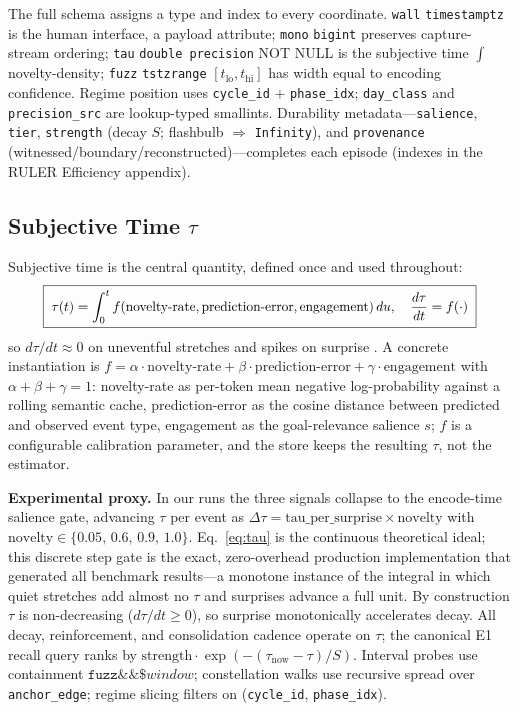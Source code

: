 \documentclass[letterpaper]{article}
\begin{document}
The full schema assigns a type and index to every coordinate. \texttt{wall} \texttt{timestamptz} is the human interface, a payload attribute; \texttt{mono} \texttt{bigint} preserves capture-stream ordering; \texttt{tau} \texttt{double precision} NOT NULL is the subjective time $\int$ novelty-density; \texttt{fuzz} \texttt{tstzrange} $[t_{\text{lo}},t_{\text{hi}}]$ has width equal to encoding confidence. Regime position uses \texttt{cycle\_id} + \texttt{phase\_idx}; \texttt{day\_class} and \texttt{precision\_src} are lookup-typed smallints. Durability metadata---\texttt{salience}, \texttt{tier}, \texttt{strength} (decay $S$; flashbulb $\Rightarrow$ \texttt{Infinity}), and \texttt{provenance} (witnessed/boundary/reconstructed)---completes each episode (indexes in the RULER Efficiency appendix).

\subsection{Subjective Time $\tau$}
Subjective time is the central quantity, defined once and used throughout:
\begin{equation}\resizebox{0.9\columnwidth}{!}{$\boxed{\;
\tau(t) = \int_{0}^{t} f(\text{novelty-rate}, \text{prediction-error}, \text{engagement})\,du,
\quad \frac{d\tau}{dt} = f(\cdot)
\;}$}\label{eq:tau}
\end{equation}
so $d\tau/dt\approx 0$ on uneventful stretches and spikes on surprise \citep{schmidhuber1991curiosity}. A concrete instantiation is $f = \alpha\cdot\text{novelty-rate} + \beta\cdot\text{prediction-error} + \gamma\cdot\text{engagement}$ with $\alpha+\beta+\gamma=1$: novelty-rate as per-token mean negative log-probability against a rolling semantic cache, prediction-error as the cosine distance between predicted and observed event type, engagement as the goal-relevance salience $s$; $f$ is a configurable calibration parameter, and the store keeps the resulting $\tau$, not the estimator.

\textbf{Experimental proxy.} In our runs the three signals collapse to the encode-time salience gate, advancing $\tau$ per event as $\Delta\tau = \text{tau\_per\_surprise}\times\text{novelty}$ with $\text{novelty}\in\{0.05,\,0.6,\,0.9,\,1.0\}$. Eq.~\ref{eq:tau} is the continuous theoretical ideal; this discrete step gate is the exact, zero-overhead production implementation that generated all benchmark results---a monotone instance of the integral in which quiet stretches add almost no $\tau$ and surprises advance a full unit. By construction $\tau$ is non-decreasing ($d\tau/dt \ge 0$), so surprise monotonically accelerates decay. All decay, reinforcement, and consolidation cadence operate on $\tau$; the canonical E1 recall query ranks by $\text{strength}\cdot \exp(-(\tau_{\text{now}}-\tau)/S)$. Interval probes use containment $\texttt{fuzz} \&\& \$window$; constellation walks use recursive spread over \texttt{anchor\_edge}; regime slicing filters on (\texttt{cycle\_id}, \texttt{phase\_idx}).
\end{document}
